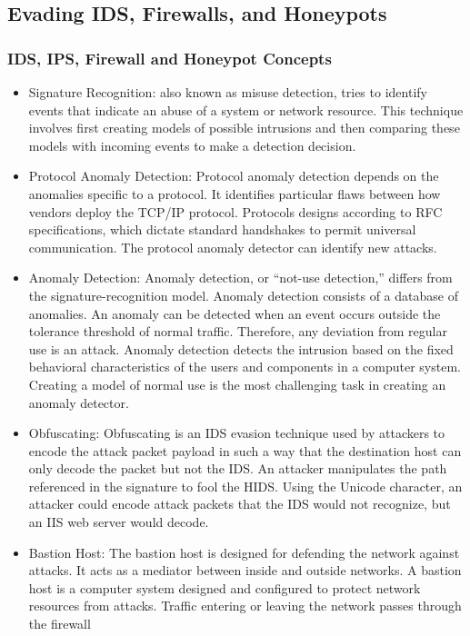 \subsection{Evading IDS, Firewalls, and Honeypots}
\subsubsection{IDS, IPS, Firewall and Honeypot Concepts}
\begin{itemize}
    \item Signature Recognition: also known as misuse detection, tries to identify events that indicate an abuse of a system or network resource. This technique involves first creating models of possible intrusions and then comparing these models with incoming events to make a detection decision.
    \item Protocol Anomaly Detection: Protocol anomaly detection depends on the anomalies specific to a protocol. It identifies particular flaws between how vendors deploy the TCP/IP protocol. Protocols designs according to RFC specifications, which dictate standard handshakes to permit universal communication. The protocol anomaly detector can identify new attacks.
    \item Anomaly Detection: Anomaly detection, or “not-use detection,” differs from the signature-recognition model. Anomaly detection consists of a database of anomalies. An anomaly can be detected when an event occurs outside the tolerance threshold of normal traffic. Therefore, any deviation from regular use is an attack. Anomaly detection detects the intrusion based on the fixed behavioral characteristics of the users and components in a computer system. Creating a model of normal use is the most challenging task in creating an anomaly detector.
    \item Obfuscating: Obfuscating is an IDS evasion technique used by attackers to encode the attack packet payload in such a way that the destination host can only decode the packet but not the IDS. An attacker manipulates the path referenced in the signature to fool the HIDS. Using the Unicode character, an attacker could encode attack packets that the IDS would not recognize, but an IIS web server would decode.
    \item Bastion Host: The bastion host is designed for defending the network against attacks. It acts as a mediator between inside and outside networks. A bastion host is a computer system designed and configured to protect network resources from attacks. Traffic entering or leaving the network passes through the firewall

\end{itemize}
